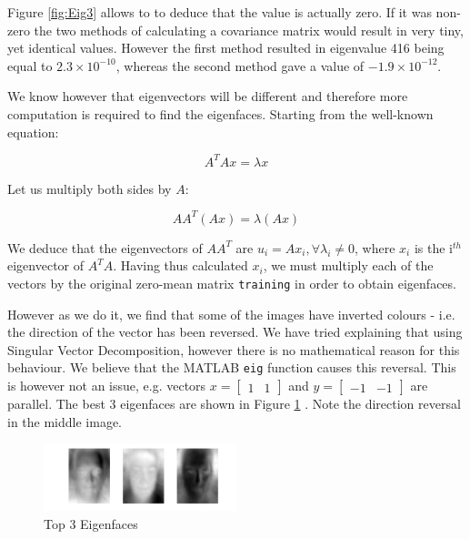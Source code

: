 \documentclass[10pt,twocolumn,letterpaper]{article}
\begin{document}
Figure \ref{fig:Eig3} allows to to deduce that the  value is actually zero. If it was non-zero the two methods of calculating a covariance matrix would result in very tiny, yet identical values. However the first method resulted in eigenvalue 416 being equal to $2.3 \times 10^{-10}$, whereas the second method gave a value of $-1.9 \times 10^{-12}$.

We know however that eigenvectors will be different and therefore more computation is required to find the eigenfaces. Starting from the well-known equation:

\begin{equation}
A^TAx = \lambda x
\end{equation}

Let us multiply both sides by $A$:

\begin{equation}
AA^T(Ax) = \lambda (Ax)
\end{equation}

We deduce that the eigenvectors of $AA^T$ are $u_i = Ax_i, \forall \lambda_i \neq 0$, where $x_i$ is the i$^{th}$ eigenvector of $A^TA$. Having thus calculated $x_i$, we must multiply each of the vectors by the original zero-mean matrix {\tt\small training} in order to obtain eigenfaces.

However as we do it, we find that some of the images have inverted colours - i.e. the direction of the vector has been reversed. We have tried explaining that using Singular Vector Decomposition, however there is no mathematical reason for this behaviour. We believe that the MATLAB {\tt\small eig} function causes this reversal. This is however not an issue, e.g. vectors $x= \begin{bmatrix}
1&1 \end{bmatrix} $ and $y= \begin{bmatrix}
-1&-1 \end{bmatrix} $ are parallel. The best 3 eigenfaces are shown in Figure \ref{fig:Eig4} . Note the direction reversal in the middle image.

\begin{figure}[H]
\centering
\includegraphics[width=0.5\textwidth]{../results/Q1B_PCA_Eigenfaces}

  \caption{Top 3 Eigenfaces \label{fig:Eig4}}

\end{figure}
\end{document}
